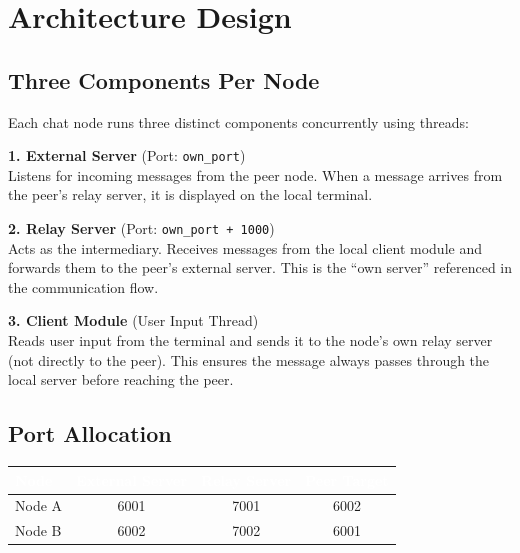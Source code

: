 \documentclass[11pt]{article}
\begin{document}
\newpage

\section{Architecture Design}

\subsection{Three Components Per Node}

Each chat node runs three distinct components concurrently using threads:

\begin{shadedbox}
\textbf{1. External Server} (Port: \texttt{own\_port}) \\
Listens for incoming messages from the peer node. When a message arrives from the peer's relay server, it is displayed on the local terminal.

\vspace{6pt}
\textbf{2. Relay Server} (Port: \texttt{own\_port + 1000}) \\
Acts as the intermediary. Receives messages from the local client module and forwards them to the peer's external server. This is the ``own server'' referenced in the communication flow.

\vspace{6pt}
\textbf{3. Client Module} (User Input Thread) \\
Reads user input from the terminal and sends it to the node's own relay server (not directly to the peer). This ensures the message always passes through the local server before reaching the peer.
\end{shadedbox}

\subsection{Port Allocation}

\begin{center}
\begin{tabular}{|l|c|c|c|}
\hline
\rowcolor{tableheader}
\textcolor{white}{\textbf{Node}} & \textcolor{white}{\textbf{External Server}} & \textcolor{white}{\textbf{Relay Server}} & \textcolor{white}{\textbf{Peer Target}} \\ \hline
Node A & 6001 & 7001 & 6002 \\ \hline
Node B & 6002 & 7002 & 6001 \\ \hline
\end{tabular}
\end{center}
\end{document}
